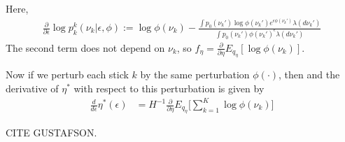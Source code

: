 \documentclass[a4paper]{article}
\begin{document}
Here,
\begin{align}
  \frac{\partial}{\partial \epsilon} \log p_k^k(\nu_k | \epsilon, \phi) := \log \phi(\nu_k) -
    \frac{\int p_0(\nu_k')\log\phi(\nu_k')e^{\epsilon\phi(\nu_k')} \lambda(d\nu_k')}{\int p_0(\nu_k')\phi(\nu_k')^\epsilon \lambda(d\nu_k')}
\end{align}
The second term does not depend on $\nu_k$, so $f_\eta = \frac{\partial}{\partial \eta} E_{q_\eta}[\log \phi(\nu_k)]$.

Now if we perturb each stick $k$ by the same perturbation $\phi(\cdot)$, then
and the derivative of $\eta^*$ with respect to this perturbation is given by
\begin{align}
   \frac{d}{d\epsilon}\eta^*(\epsilon) &=
   H^{-1}\frac{\partial}{\partial \eta} E_{q_\eta}\Big[\sum_{k = 1}^K \log \phi(\nu_k)\Big]
  \label{eq:sensitivity_exp_pert}
\end{align}

CITE GUSTAFSON.
\end{document}
